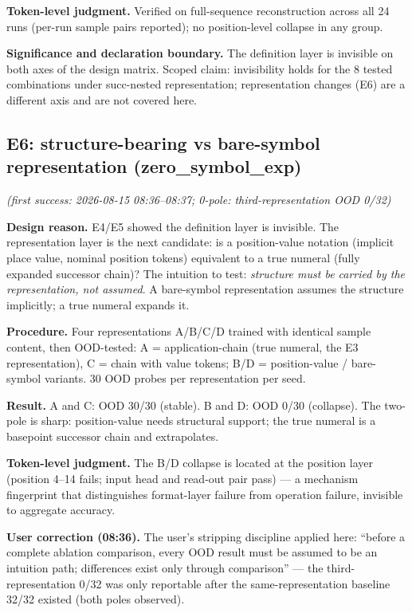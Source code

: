 \documentclass[sigplan,10pt,anonymous,review]{acmart}
\begin{document}
\textbf{Token-level judgment.} Verified on full-sequence reconstruction
across all 24 runs (per-run sample pairs reported); no position-level
collapse in any group.

\textbf{Significance and declaration boundary.} The definition layer is
invisible on both axes of the design matrix. Scoped claim: invisibility
holds for the 8 tested combinations under succ-nested representation;
representation changes (E6) are a different axis and are not covered here.

\subsection{E6: structure-bearing vs bare-symbol representation (zero\_symbol\_exp)}\hfill\textit{(first success: 2026-08-15 08:36--08:37; 0-pole: third-representation OOD 0/32)}

\textbf{Design reason.} E4/E5 showed the definition layer is invisible. The
representation layer is the next candidate: is a position-value notation
(implicit place value, nominal position tokens) equivalent to a true numeral
(fully expanded successor chain)? The intuition to test: \emph{structure
must be carried by the representation, not assumed}. A bare-symbol
representation assumes the structure implicitly; a true numeral expands it.

\textbf{Procedure.} Four representations A/B/C/D trained with identical
sample content, then OOD-tested: A = application-chain (true numeral, the
E3 representation), C = chain with value tokens; B/D = position-value /
bare-symbol variants. 30 OOD probes per representation per seed.

\textbf{Result.} A and C: OOD 30/30 (stable). B and D: OOD 0/30 (collapse).
The two-pole is sharp: position-value needs structural support; the true
numeral is a basepoint successor chain and extrapolates.

\textbf{Token-level judgment.} The B/D collapse is located at the position
layer (position 4--14 fails; input head and read-out pair pass) --- a
mechanism fingerprint that distinguishes format-layer failure from
operation failure, invisible to aggregate accuracy.

\textbf{User correction (08:36).} The user's stripping discipline applied
here: ``before a complete ablation comparison, every OOD result must be
assumed to be an intuition path; differences exist only through
comparison'' --- the third-representation 0/32 was only reportable after
the same-representation baseline 32/32 existed (both poles observed).
\end{document}
